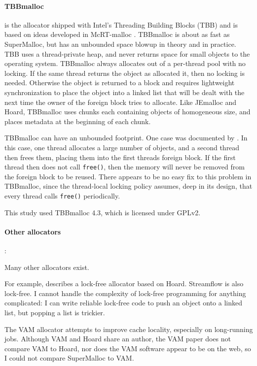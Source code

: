 \documentclass[natbib,sort&compress,10pt]{sigplanconf}
\newcommand{\code}[1]{\texttt{#1}}
\begin{document}
{\paragraph{TBBmalloc}} \cite{KukanovVo07} is the allocator shipped
with Intel's Threading Building Blocks (TBB) and is based on ideas
developed in McRT-malloc \cite{HudsonSaAd06}.  TBBmalloc is about as
fast as SuperMalloc, but has an unbounded space blowup in theory and
in practice.  TBB uses a thread-private heap, and never returns space
for small objects to the operating system.  TBBmalloc always allocates
out of a per-thread pool with no locking.  If the same thread returns
the object as allocated it, then no locking is needed.  Otherwise the
object is returned to a  block and requires lightweight
synchronization to place the object into a linked list that will be
dealt with the next time the owner of the foreign block tries to
allocate.  Like JEmalloc and Hoard, TBBmalloc uses chunks each
containing objects of homogeneous size, and places metadata at the
beginning of each chunk.

TBBmalloc can have an unbounded footprint.  One case was documented by
\cite{Vyukov08}.  In this case, one thread allocates a large number of
objects, and a second thread then frees them, placing them into the
first threads foreign block.  If the first thread then does not call
\code{free()}, then the memory will never be removed from the foreign
block to be reused.  There appears to be no easy fix to this problem
in TBBmalloc, since the thread-local locking policy assumes, deep in
its design, that every thread calls \code{free()} periodically.

This study used TBBmalloc 4.3, which is licensed under GPLv2.

{\paragraph{Other allocators}:} Many other allocators exist.

For example, \cite{Michael04} describes a lock-free allocator based on
Hoard.  Streamflow \cite{SchneiderAnNi06} is also lock-free.  I cannot
handle the complexity of lock-free programming for anything
complicated: I can write reliable lock-free code to push an object
onto a linked list, but popping a list is trickier.

The VAM allocator \cite{FengBe05} attempts to improve cache locality,
especially on long-running jobs.  Although VAM and Hoard share an
author, the VAM paper does not compare VAM to Hoard, nor does the VAM
software appear to be on the web, so I could not compare SuperMalloc
to VAM\@.
\end{document}
